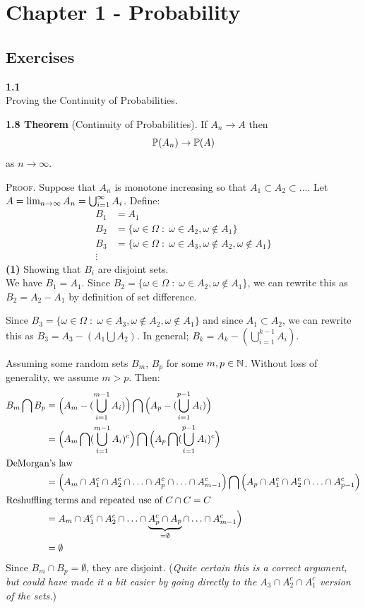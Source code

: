 
\newpage
\section{Chapter 1 - Probability}

\subsection*{Exercises}

\textbf{1.1}\\  %
Proving the Continuity of Probabilities.

\bigskip\noindent
\textbf{1.8 Theorem} (Continuity of Probabilities). If $A_n\rightarrow A$
then
\[
    \P(A_n)\rightarrow\P(A)
\]
as $n\rightarrow\infty$.

\bigskip\noindent
\textsc{Proof}. Suppose that $A_n$ is monotone increasing so that
$A_1\subset A_2 \subset\ldots$.
Let $A = \lim_{n\ra\infty} A_n = \bigcup_{i=1}^\infty A_i$.
Define:
\begin{align*}
    B_1 &= A_1 \\
    B_2 &= \{\omega\in\Omega \;:\; \omega\in A_2,\omega\not\in A_1\} \\
    B_3 &= \{\omega\in\Omega \;:\; \omega\in A_3,\omega\not\in A_2,\omega\not\in A_1\} \\
    \vdots &
\end{align*}
\textbf{(1)} Showing that $B_i$ are disjoint sets.\\
We have $B_1 = A_1$. Since $B_2 = \{\omega\in\Omega \;:\; \omega\in A_2,\omega\not\in A_1\}$,
we can rewrite this as $B_2 = A_2 - A_1$ by definition of set difference.

Since $B_3 = \{\omega\in\Omega \;:\; \omega\in A_3,\omega\not\in A_2,\omega\not\in A_1\}$
and since $A_1\subset A_2$, we can rewrite this as $B_3 = A_3 - (A_1\bigcup A_2)$.
In general; $B_k = A_k - (\bigcup_{i=1}^{k-1}A_i)$.

Assuming some random sets $B_m$, $B_p$ for some $m,p\in\N$. Without loss of generality,
we assume $m > p$. Then:
\begin{align*}
    B_m\bigcap B_p &=
    \Big(A_m - (\bigcup_{i=1}^{m-1}A_i)\Big)\bigcap \Big(A_p - (\bigcup_{i=1}^{p-1}A_i)\Big)\\
    &= 
    \Big(A_m \bigcap(\bigcup_{i=1}^{m-1}A_i)^c\Big)\bigcap \Big(A_p \bigcap (\bigcup_{i=1}^{p-1}A_i)^c\Big)\\
    \shortintertext{DeMorgan's law}
    &= 
    \Big(A_m \cap A_1^c \cap A_2^c \cap \ldots \cap A_p^c \cap \ldots \cap A_{m-1}^c\Big)\bigcap
    \Big(A_p \cap A_1^c \cap A_2^c \cap \ldots \cap A_{p-1}^c\Big) \\
\shortintertext{Reshuffling terms and repeated use of $C\cap C = C$}
    &= A_m \cap A_1^c \cap A_2^c \cap \ldots \cap \underbrace{A_p^c\cap A_p}_{=\emptyset} \cap \ldots \cap A_{m-1}^c\Big) \\
    &= \emptyset
\end{align*}
Since $B_m\cap B_p = \emptyset$, they are disjoint. (\emph{Quite certain this is a correct argument, but could have
made it a bit easier by going directly to the $A_3\cap A_2^c\cap A_1^c$ version of the sets.})


